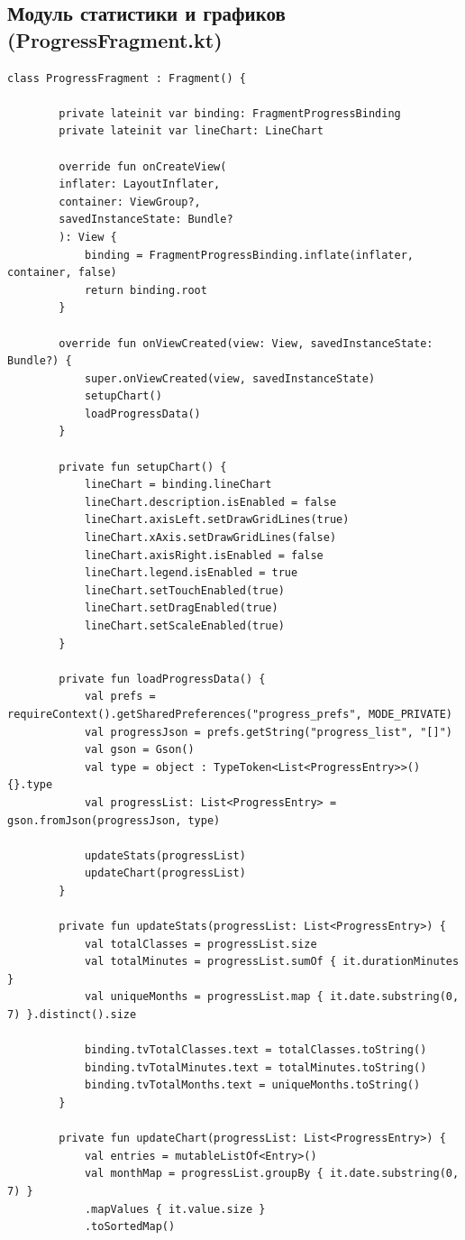 \subsection{Модуль статистики и графиков (ProgressFragment.kt)}

\begin{lstlisting}[breaklines=true]
	class ProgressFragment : Fragment() {
		
		private lateinit var binding: FragmentProgressBinding
		private lateinit var lineChart: LineChart
		
		override fun onCreateView(
		inflater: LayoutInflater,
		container: ViewGroup?,
		savedInstanceState: Bundle?
		): View {
			binding = FragmentProgressBinding.inflate(inflater, container, false)
			return binding.root
		}
		
		override fun onViewCreated(view: View, savedInstanceState: Bundle?) {
			super.onViewCreated(view, savedInstanceState)
			setupChart()
			loadProgressData()
		}
		
		private fun setupChart() {
			lineChart = binding.lineChart
			lineChart.description.isEnabled = false
			lineChart.axisLeft.setDrawGridLines(true)
			lineChart.xAxis.setDrawGridLines(false)
			lineChart.axisRight.isEnabled = false
			lineChart.legend.isEnabled = true
			lineChart.setTouchEnabled(true)
			lineChart.setDragEnabled(true)
			lineChart.setScaleEnabled(true)
		}
		
		private fun loadProgressData() {
			val prefs = requireContext().getSharedPreferences("progress_prefs", MODE_PRIVATE)
			val progressJson = prefs.getString("progress_list", "[]")
			val gson = Gson()
			val type = object : TypeToken<List<ProgressEntry>>() {}.type
			val progressList: List<ProgressEntry> = gson.fromJson(progressJson, type)
			
			updateStats(progressList)
			updateChart(progressList)
		}
		
		private fun updateStats(progressList: List<ProgressEntry>) {
			val totalClasses = progressList.size
			val totalMinutes = progressList.sumOf { it.durationMinutes }
			val uniqueMonths = progressList.map { it.date.substring(0, 7) }.distinct().size
			
			binding.tvTotalClasses.text = totalClasses.toString()
			binding.tvTotalMinutes.text = totalMinutes.toString()
			binding.tvTotalMonths.text = uniqueMonths.toString()
		}
		
		private fun updateChart(progressList: List<ProgressEntry>) {
			val entries = mutableListOf<Entry>()
			val monthMap = progressList.groupBy { it.date.substring(0, 7) }
			.mapValues { it.value.size }
			.toSortedMap()
			

\end{lstlisting}
